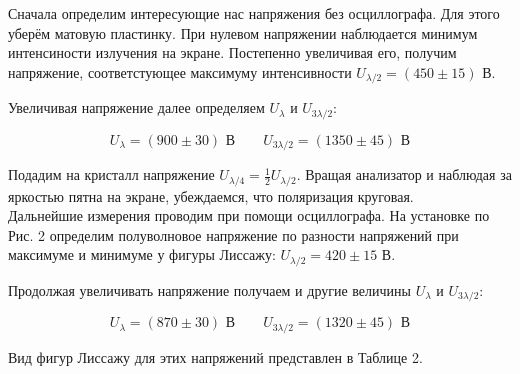 \documentclass[a4paper,12pt]{article} %
\begin{document}
Сначала определим интересующие нас напряжения без осциллографа. Для этого уберём матовую пластинку. При нулевом напряжении наблюдается минимум интенсиности излучения на экране. Постепенно увеличивая его, получим напряжение, соответстующее максимуму интенсивности $U_{\lambda/2} = (450 \pm 15) \text{ В}$.

Увеличивая напряжение далее определяем $U_\lambda$ и $U_{3\lambda/2}$:

\[U_\lambda = (900 \pm 30) \text{ В} \qquad U_{3\lambda/2} = (1350 \pm 45) \text{ В}\]

\par Подадим на кристалл напряжение $U_{\lambda/4} = \frac{1}{2}U_{\lambda/2}$. Вращая анализатор и наблюдая за яркостью пятна на экране, убеждаемся, что поляризация круговая.\\

Дальнейшие измерения проводим при помощи осциллографа. На установке по Рис. 2 определим полуволновое напряжение по разности напряжений при максимуме и минимуме у фигуры Лиссажу: \underline{$U_{\lambda/2} = 420 \pm 15 \text{ В}$}. 

Продолжая увеличивать напряжение получаем и другие величины $U_\lambda$ и $U_{3\lambda/2}$:

\[U_\lambda = (870 \pm 30) \text{ В} \qquad U_{3\lambda/2} = (1320 \pm 45) \text{ В}\]

Вид фигур Лиссажу для этих напряжений представлен в Таблице 2.
\end{document}
